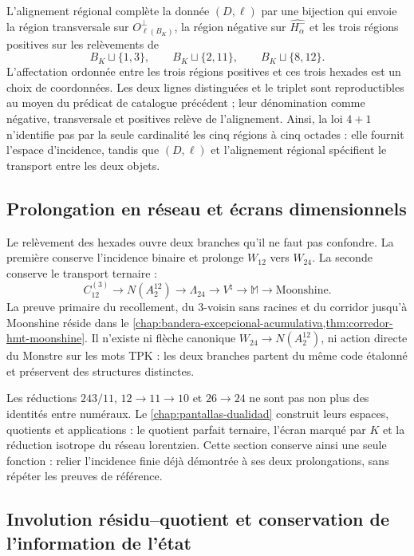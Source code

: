L'alignement régional complète la donnée \((D,\ell)\) par une bijection
qui envoie la région transversale sur \(O_{\ell(B_K)}^\perp\), la région
négative sur \(\widehat{H_\alpha^-}\) et les trois régions positives sur les
relèvements de
\[
 B_K\sqcup\{1,3\},\qquad
 B_K\sqcup\{2,11\},\qquad
 B_K\sqcup\{8,12\}.
\]
L'affectation ordonnée entre les trois régions positives et ces trois hexades
est un choix de coordonnées. Les deux lignes distinguées et le triplet sont
reproductibles au moyen du prédicat de catalogue précédent ; leur dénomination comme
négative, transversale et positives relève de l'alignement. Ainsi, la loi \(4+1\) n'identifie pas par la seule
cardinalité les cinq régions à cinq octades : elle fournit l'espace
d'incidence, tandis que \((D,\ell)\) et l'alignement régional spécifient
le transport entre les deux objets.

\subsection{Prolongation en réseau et écrans dimensionnels}

Le relèvement des hexades ouvre deux branches qu'il ne faut pas confondre. La première
conserve l'incidence binaire et prolonge \(W_{12}\) vers \(W_{24}\). La
seconde conserve le transport ternaire :
\[
C_{12}^{(3)}
\longrightarrow N(A_2^{12})
\longrightarrow\Lambda_{24}
\longrightarrow V^\natural
\longrightarrow\mathbb M
\longrightarrow\text{Moonshine}.
\]
La preuve primaire du recollement, du \(3\)-voisin sans racines et du corridor
jusqu'à Moonshine réside dans le
\cref{chap:bandera-excepcional-acumulativa,thm:corredor-hmt-moonshine}.
Il n'existe ni flèche canonique \(W_{24}\to N(A_2^{12})\), ni action
directe du Monstre sur les mots TPK : les deux branches partent du même
code étalonné et préservent des structures distinctes.

Les réductions \(243/11\), \(12\to11\to10\) et \(26\to24\) ne sont pas non plus des
identités entre numéraux. Le \cref{chap:pantallas-dualidad} construit leurs
espaces, quotients et applications : le quotient parfait ternaire, l'écran
marqué par \(K\) et la réduction isotrope du réseau lorentzien. Cette
section conserve ainsi une seule fonction : relier l'incidence finie déjà
démontrée à ses deux prolongations, sans répéter les preuves de référence.

\subsection{Involution résidu–quotient et conservation de l'information de l'état}

